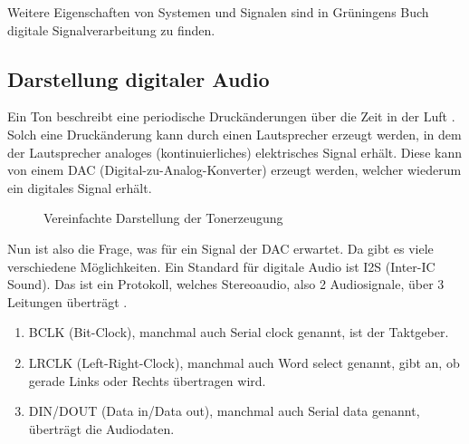 Weitere Eigenschaften von Systemen und Signalen sind in Grüningens Buch
digitale Signalverarbeitung \cite{grueningen2008dsv} zu finden.

\subsection{Darstellung  digitaler Audio}



Ein Ton beschreibt eine
periodische Druckänderungen über die Zeit in der Luft \cite[17.1]{openStacksWaves}.
Solch eine
Druckänderung kann durch einen Lautsprecher erzeugt werden, in dem der
Lautsprecher analoges (kontinuierliches) elektrisches Signal erhält. Diese 
kann von einem DAC (Digital-zu-Analog-Konverter) erzeugt werden,
welcher wiederum ein digitales Signal erhält.

\begin{figure}[ht]
    \centering
    \caption{Vereinfachte Darstellung der Tonerzeugung}
    \label{fig:tonerzeugung}
\end{figure}


Nun ist also die Frage, was für ein Signal der DAC erwartet. Da gibt es viele
verschiedene Möglichkeiten. Ein Standard für digitale Audio ist 
I2S (Inter-IC Sound). Das ist ein Protokoll, welches Stereoaudio, also 2 
Audiosignale, über 3 Leitungen überträgt \cite{esp32s3i2s}.
\begin{enumerate}
    \item BCLK (Bit-Clock), manchmal auch Serial clock genannt, ist der Taktgeber.
    \item LRCLK (Left-Right-Clock), manchmal auch Word select genannt, gibt an, ob gerade Links oder Rechts übertragen
     wird.
    \item DIN/DOUT (Data in/Data out), manchmal auch Serial data genannt, überträgt die Audiodaten.
\end{enumerate}

